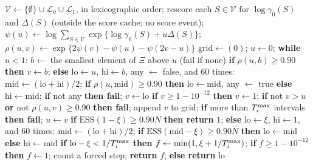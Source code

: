 \begin{algorithm}
{\begin{algorithmic}[1]
\EndProcedure
{}
\State $\mathcal V\gets\{\emptyset\}\cup\mathcal L_0\cup\mathcal L_1$, in lexicographic order; rescore each $S\in\mathcal V$ for $\log\gamma_0(S)$ and $\Delta(S)$ (outside the score cache; no score event); $\psi(u)\gets\log\sum_{S\in\mathcal V}\exp\{\log\gamma_0(S)+u\Delta(S)\}$; $\rho(u,v)\gets\exp\{2\psi(v)-\psi(u)-\psi(2v-u)\}$ %
\State $\mathrm{grid}\gets(0)$; $u\gets0$; \textbf{while} $u<1$: $b\gets$ the smallest element of $\Xi$ above $u$ (fail if none) %
\State \textbf{if} $\rho(u,b)\ge0.90$ \textbf{then} $v\gets b$; \textbf{else} $\mathrm{lo}\gets u$, $\mathrm{hi}\gets b$, any $\gets$ false, and $60$ times: $\mathrm{mid}\gets(\mathrm{lo}+\mathrm{hi})/2$; \textbf{if} $\rho(u,\mathrm{mid})\ge0.90$ \textbf{then} $\mathrm{lo}\gets\mathrm{mid}$, any $\gets$ true \textbf{else} $\mathrm{hi}\gets\mathrm{mid}$; \textbf{if} not any \textbf{then fail}; $v\gets\mathrm{lo}$ %
\State \textbf{if} $v\ge1-10^{-12}$ \textbf{then} $v\gets1$; \textbf{if} not $v>u$ \textbf{or} not $\rho(u,v)\ge0.90$ \textbf{then fail}; append $v$ to grid; \textbf{if} more than $T^{\max}_i$ intervals \textbf{then fail}; $u\gets v$ %
\EndProcedure
{}
\State \textbf{if} $\mathrm{ESS}(1-\xi)\ge0.90N$ \textbf{then return} $1$; \textbf{else} $\mathrm{lo}\gets\xi$, $\mathrm{hi}\gets1$, and $60$ times: $\mathrm{mid}\gets(\mathrm{lo}+\mathrm{hi})/2$; \textbf{if} $\mathrm{ESS}(\mathrm{mid}-\xi)\ge0.90N$ \textbf{then} $\mathrm{lo}\gets\mathrm{mid}$ \textbf{else} $\mathrm{hi}\gets\mathrm{mid}$ %
\State \textbf{if} $\mathrm{lo}-\xi<1/T^{\max}_i$ \textbf{then} $f\gets\min(1,\xi+1/T^{\max}_i)$; \textbf{if} $f\ge1-10^{-12}$ \textbf{then} $f\gets1$; count a forced step; \textbf{return} $f$; \textbf{else return} $\mathrm{lo}$ %
\EndProcedure
\end{algorithmic}}
\end{algorithm}

